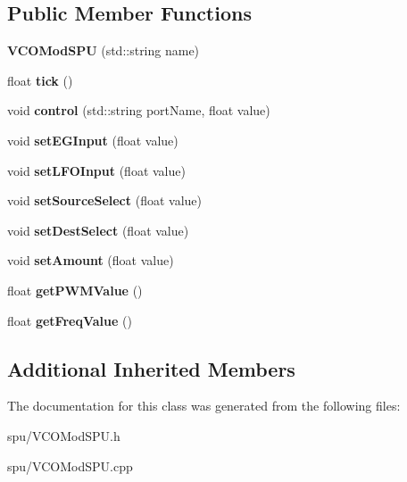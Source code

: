 \subsection*{Public Member Functions}
\begin{DoxyCompactItemize}
\item 
{\bfseries V\+C\+O\+Mod\+S\+PU} (std\+::string name)\hypertarget{classVCOModSPU_ae11ac554564dbae51b4f7d1a19f63dfc}{}\label{classVCOModSPU_ae11ac554564dbae51b4f7d1a19f63dfc}

\item 
float {\bfseries tick} ()\hypertarget{classVCOModSPU_a92982b411ee6a7d31eafa71678be6b63}{}\label{classVCOModSPU_a92982b411ee6a7d31eafa71678be6b63}

\item 
void {\bfseries control} (std\+::string port\+Name, float value)\hypertarget{classVCOModSPU_a300bde3f99008ce0b8a4ff38dc8c3201}{}\label{classVCOModSPU_a300bde3f99008ce0b8a4ff38dc8c3201}

\item 
void {\bfseries set\+E\+G\+Input} (float value)\hypertarget{classVCOModSPU_afecf559bef09d7b469e3ebedddd05866}{}\label{classVCOModSPU_afecf559bef09d7b469e3ebedddd05866}

\item 
void {\bfseries set\+L\+F\+O\+Input} (float value)\hypertarget{classVCOModSPU_a049f415e96c81b6dd63f99c7cc8fe35d}{}\label{classVCOModSPU_a049f415e96c81b6dd63f99c7cc8fe35d}

\item 
void {\bfseries set\+Source\+Select} (float value)\hypertarget{classVCOModSPU_af1e0d57fcd491271ce0775bad41c168a}{}\label{classVCOModSPU_af1e0d57fcd491271ce0775bad41c168a}

\item 
void {\bfseries set\+Dest\+Select} (float value)\hypertarget{classVCOModSPU_aaad0c1644bb9d44c33929fdb5c7a7ce2}{}\label{classVCOModSPU_aaad0c1644bb9d44c33929fdb5c7a7ce2}

\item 
void {\bfseries set\+Amount} (float value)\hypertarget{classVCOModSPU_a5c2f54cbe8e3d6a5bedd55783054da83}{}\label{classVCOModSPU_a5c2f54cbe8e3d6a5bedd55783054da83}

\item 
float {\bfseries get\+P\+W\+M\+Value} ()\hypertarget{classVCOModSPU_ad2434524030667ff7662bf4c0733cc77}{}\label{classVCOModSPU_ad2434524030667ff7662bf4c0733cc77}

\item 
float {\bfseries get\+Freq\+Value} ()\hypertarget{classVCOModSPU_ac1fef0a06f8362f8c723260cd3c6f0c2}{}\label{classVCOModSPU_ac1fef0a06f8362f8c723260cd3c6f0c2}

\end{DoxyCompactItemize}
\subsection*{Additional Inherited Members}


The documentation for this class was generated from the following files\+:\begin{DoxyCompactItemize}
\item 
spu/V\+C\+O\+Mod\+S\+P\+U.\+h\item 
spu/V\+C\+O\+Mod\+S\+P\+U.\+cpp\end{DoxyCompactItemize}
